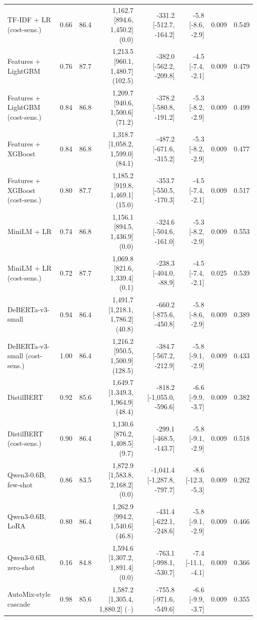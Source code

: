 \documentclass[final,5p,times,twocolumn]{elsarticle}
\theoremstyle{plain}
\begin{document}
\begin{table}[ht]
\begin{tabular}{@{}lrrrrrrr@{}}
TF-IDF + LR (cost-sens.) & 0.66 & 86.4 & 1{,}162.7 [894.6, 1{,}450.2] (0.0) & -331.2 [-512.7, -164.2] & -5.8 [-8.6, -2.9] & 0.009 & 0.549 \\
Features + LightGBM & 0.76 & 87.7 & 1{,}213.5 [960.1, 1{,}480.7] (102.5) & -382.0 [-562.2, -209.8] & -4.5 [-7.4, -2.1] & 0.009 & 0.479 \\
Features + LightGBM (cost-sens.) & 0.84 & 86.8 & 1{,}209.7 [940.6, 1{,}500.6] (71.2) & -378.2 [-580.8, -191.2] & -5.3 [-8.2, -2.9] & 0.009 & 0.499 \\
Features + XGBoost & 0.84 & 86.8 & 1{,}318.7 [1{,}058.2, 1{,}599.0] (84.1) & -487.2 [-671.6, -315.2] & -5.3 [-8.2, -2.9] & 0.009 & 0.477 \\
Features + XGBoost (cost-sens.) & 0.80 & 87.7 & 1{,}185.2 [919.8, 1{,}469.1] (15.0) & -353.7 [-550.5, -170.3] & -4.5 [-7.4, -2.1] & 0.009 & 0.517 \\
MiniLM + LR & 0.74 & 86.8 & 1{,}156.1 [894.5, 1{,}436.9] (0.0) & -324.6 [-504.6, -161.0] & -5.3 [-8.2, -2.9] & 0.009 & 0.553 \\
MiniLM + LR (cost-sens.) & 0.72 & 87.7 & 1{,}069.8 [821.6, 1{,}339.4] (0.1) & -238.3 [-404.0, -88.9] & -4.5 [-7.4, -2.1] & 0.025 & 0.539 \\
DeBERTa-v3-small & 0.94 & 86.4 & 1{,}491.7 [1{,}218.1, 1{,}786.2] (40.8) & -660.2 [-875.6, -450.8] & -5.8 [-8.6, -2.9] & 0.009 & 0.389 \\
DeBERTa-v3-small (cost-sens.) & 1.00 & 86.4 & 1{,}216.2 [950.5, 1{,}500.9] (128.5) & -384.7 [-567.2, -212.9] & -5.8 [-9.1, -2.9] & 0.009 & 0.433 \\
DistilBERT & 0.92 & 85.6 & 1{,}649.7 [1{,}349.3, 1{,}964.9] (48.4) & -818.2 [-1{,}055.0, -596.6] & -6.6 [-9.9, -3.7] & 0.009 & 0.382 \\
DistilBERT (cost-sens.) & 0.90 & 86.4 & 1{,}130.6 [876.2, 1{,}408.5] (9.7) & -299.1 [-468.5, -143.7] & -5.8 [-9.1, -2.9] & 0.009 & 0.518 \\
Qwen3-0.6B, few-shot & 0.86 & 83.5 & 1{,}872.9 [1{,}583.8, 2{,}168.2] (0.0) & -1{,}041.4 [-1{,}287.8, -797.7] & -8.6 [-12.3, -5.3] & 0.009 & 0.262 \\
Qwen3-0.6B, LoRA & 0.80 & 86.4 & 1{,}262.9 [994.2, 1{,}540.6] (46.8) & -431.4 [-622.1, -248.6] & -5.8 [-9.1, -2.9] & 0.009 & 0.466 \\
Qwen3-0.6B, zero-shot & 0.16 & 84.8 & 1{,}594.6 [1{,}307.2, 1{,}891.4] (0.0) & -763.1 [-998.1, -530.7] & -7.4 [-11.1, -4.1] & 0.009 & 0.366 \\
AutoMix-style cascade & 0.98 & 85.6 & 1{,}587.2 [1{,}305.4, 1{,}880.2] (--) & -755.8 [-971.6, -549.6] & -6.6 [-9.9, -3.7] & 0.009 & 0.355 \\
\bottomrule
\end{tabular}

\end{table}
\end{document}
